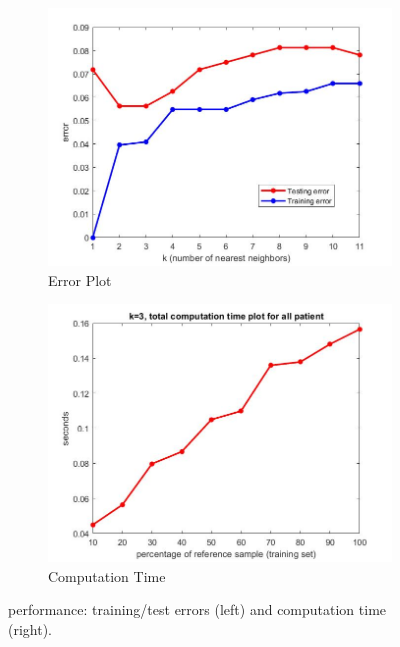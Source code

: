 \begin{figure}
	\centering
	\begin{subfigure}{.38\textwidth}
		\centering
		\includegraphics[width=.9\linewidth]{figures/knnerror.jpg}
		\caption{Error Plot}
		\label{fig:knnerror}
	\end{subfigure}%
	\begin{subfigure}{.38\textwidth}
		\centering
		\includegraphics[width=.9\linewidth]{figures/kNNpercentage.jpg}
		\caption{Computation Time}
		\label{fig:knncomp}
	\end{subfigure}
	\caption{\knn{} performance: training/test errors (left) and 
	computation time (right).}
	\label{fig:knn}
\end{figure}


